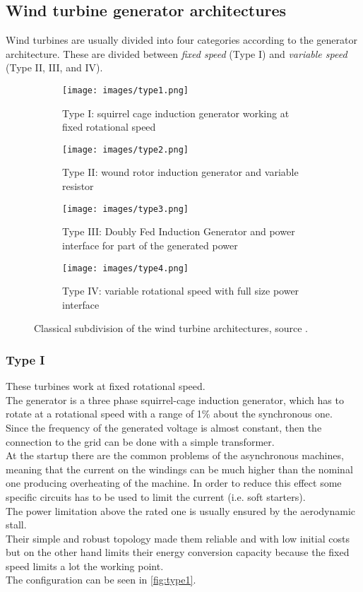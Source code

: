 \subsection{Wind turbine generator architectures}
Wind turbines are usually divided into four categories according to the generator architecture. These are divided between \textit{fixed speed} (Type I) and \textit{variable speed} (Type II, III, and IV). 
\begin{figure}[htb]
  \centering
  \begin{subfigure}{0.49\columnwidth}
    \texttt{[image: images/type1.png]}
    \caption{Type I: squirrel cage induction generator working at fixed rotational speed}
    \label{fig:type1}
  \end{subfigure}
  \begin{subfigure}{0.49\columnwidth}
    \texttt{[image: images/type2.png]}
    \caption{Type II: wound rotor induction generator and variable resistor}
    \label{fig:type2}
  \end{subfigure}
  \begin{subfigure}{0.49\columnwidth}
    \texttt{[image: images/type3.png]}
    \caption{Type III: Doubly Fed Induction Generator and power interface for part of the generated power}
    \label{fig:type3}
  \end{subfigure}
  \begin{subfigure}{0.49\columnwidth}
    \texttt{[image: images/type4.png]}
    \caption{Type IV: variable rotational speed with full size power interface}
    \label{fig:type4}
  \end{subfigure}
  \caption{Classical subdivision of the wind turbine architectures, source \cite{Burman2011IntegratingRE}. }
\end{figure}

\subsubsection{Type I}
These turbines work at fixed rotational speed. \\
The generator is a three phase squirrel-cage induction generator, which has to rotate at a rotational speed with a range of 1\% about the synchronous one.\\ 
Since the frequency of the generated voltage is almost constant, then the connection to the grid can be done with a simple transformer. \\
At the startup there are the common problems of the asynchronous machines, meaning that the current on the windings can be much higher than the nominal one producing overheating of the machine. In order to reduce this effect  some specific circuits has to be used to limit the current (i.e. soft starters).\\
The power limitation above the rated one is usually ensured by the aerodynamic stall. \\
Their simple and robust topology made them reliable and with low initial costs but on the other hand limits their energy conversion capacity because the fixed speed limits a lot the working point. \\
The configuration can be seen in \autoref{fig:type1}.

